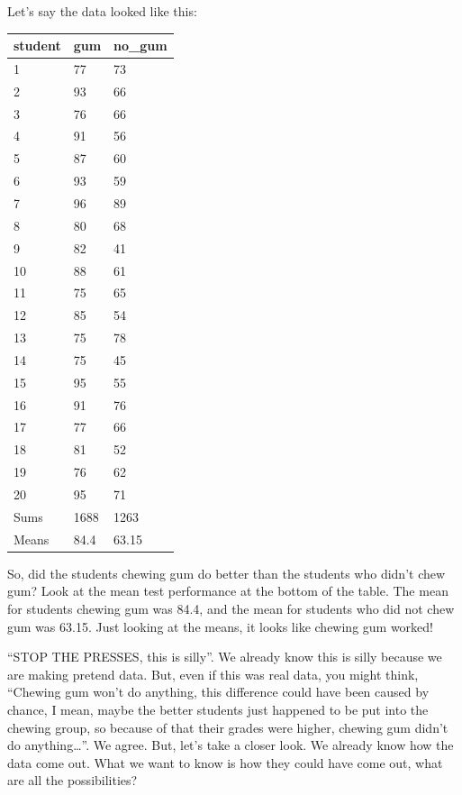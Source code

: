 \documentclass[
]{book}
\begin{document}
Let's say the data looked like this:

\begin{tabular}{l|l|l}
\hline
student & gum & no\_gum\\
\hline
1 & 77 & 73\\
\hline
2 & 93 & 66\\
\hline
3 & 76 & 66\\
\hline
4 & 91 & 56\\
\hline
5 & 87 & 60\\
\hline
6 & 93 & 59\\
\hline
7 & 96 & 89\\
\hline
8 & 80 & 68\\
\hline
9 & 82 & 41\\
\hline
10 & 88 & 61\\
\hline
11 & 75 & 65\\
\hline
12 & 85 & 54\\
\hline
13 & 75 & 78\\
\hline
14 & 75 & 45\\
\hline
15 & 95 & 55\\
\hline
16 & 91 & 76\\
\hline
17 & 77 & 66\\
\hline
18 & 81 & 52\\
\hline
19 & 76 & 62\\
\hline
20 & 95 & 71\\
\hline
Sums & 1688 & 1263\\
\hline
Means & 84.4 & 63.15\\
\hline
\end{tabular}

So, did the students chewing gum do better than the students who didn't chew gum? Look at the mean test performance at the bottom of the table. The mean for students chewing gum was 84.4, and the mean for students who did not chew gum was 63.15. Just looking at the means, it looks like chewing gum worked!

``STOP THE PRESSES, this is silly''. We already know this is silly because we are making pretend data. But, even if this was real data, you might think, ``Chewing gum won't do anything, this difference could have been caused by chance, I mean, maybe the better students just happened to be put into the chewing group, so because of that their grades were higher, chewing gum didn't do anything\ldots{}''. We agree. But, let's take a closer look. We already know how the data come out. What we want to know is how they could have come out, what are all the possibilities?
\end{document}
